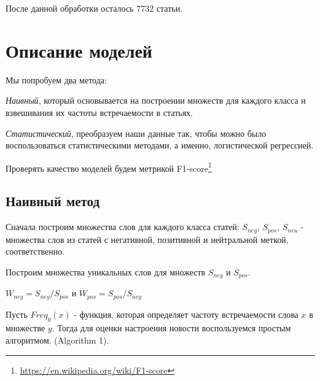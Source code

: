 \documentclass[12pt]{article}
\begin{document}
        После данной обработки осталось 7732 статьи.

    \section{Описание моделей}
        Мы попробуем два метода: 
        
        \textit{Наивный}, который основывается на построении множеств для каждого класса и взвешивания их 
        частоты встречаемости в статьях. 
        
        \textit{Статистический}, преобразуем наши данные так, чтобы можно было 
        воспользоваться статистическими методами, а именно, логистической регрессией.

        Проверять качество моделей будем метрикой F1-score\footnote{\href{https://en.wikipedia.org/wiki/F1\_score}{https://en.wikipedia.org/wiki/F1-score}}

        \subsection{Наивный метод}
            Сначала построим множества слов для каждого класса статей: $S_{neg}$,
            $S_{pos}$, $S_{neu}$ - множества слов из статей с негативной, 
            позитивной и нейтральной меткой, соответственно.

            Построим множества уникальных слов для множеств $S_{neg}$ и $S_{pos}$.
            \begin{center}
                $W_{neg} = S_{neg} / S_{pos}$ и $W_{pos} = S_{pos} / S_{neg}$
            \end{center}

            Пусть $Freq_y(x)$ - функция, которая определяет частоту встречаемости слова $x$
            в множестве $y$. Тогда для оценки настроения новости воспользуемся простым алгоритмом.
            (Algorithm 1). 
            
\end{document}
